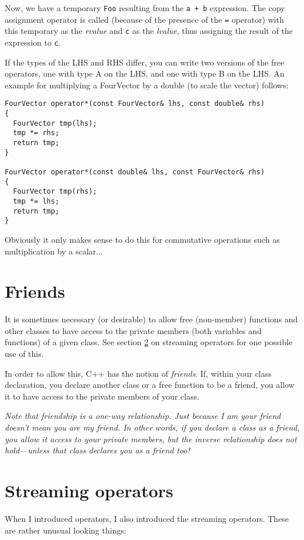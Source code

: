 \documentclass[a4paper]{scrartcl}
\begin{document}
Now, we have a temporary \verb|Foo| resulting from the \verb|a + b| expression. The copy assignment operator is called (because of the presence of the \verb|=| operator) with this temporary as the \emph{rvalue} and \verb|c| as the \emph{lvalue}, thus assigning the result of the expression to \verb|c|.

If the types of the LHS and RHS differ, you can write two versions of the free operators, one with type A on the LHS, and one with type B on the LHS. An example for multiplying a FourVector by a double (to scale the vector) follows:

\begin{verbatim}
FourVector operator*(const FourVector& lhs, const double& rhs)
{
  FourVector tmp(lhs);
  tmp *= rhs;
  return tmp;
}

FourVector operator*(const double& lhs, const FourVector& rhs)
{
  FourVector tmp(rhs);
  tmp *= lhs;
  return tmp;
}
\end{verbatim}

Obviously it only makes sense to do this for commutative operations such as multiplication by a scalar...

\section{Friends}\label{sec:friend}
It is sometimes necessary (or desirable) to allow free (non-member) functions and other classes to have access to the private members (both variables and functions) of a given class. See section \ref{sec:streaming-operators} on streaming operators for one possible use of this.

In order to allow this, C++ has the notion of \emph{friends}. If, within your class declaration, you declare another class or a free function to be a friend, you allow it to have access to the private members of your class.

\emph{Note that friendship is a one-way relationship. Just because I am your friend doesn't mean you are my friend. In other words, if you declare a class as a friend, you allow it access to your private members, but the inverse relationship does not hold---unless that class declares you as a friend too!}

\section{Streaming operators}\label{sec:streaming-operators}
When I introduced operators, I also introduced the streaming operators. These are rather unusual looking things:
\end{document}
